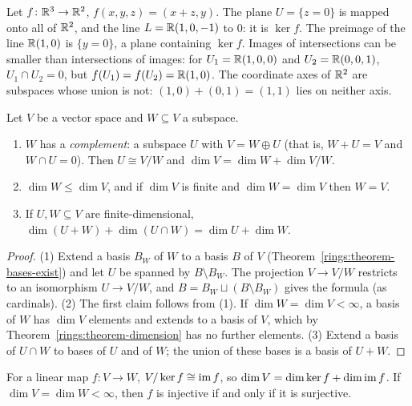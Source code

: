 \begin{example}\label{linear-algebra:example-images-subspaces}
Let $f \colon \mathbb{R}^3 \to \mathbb{R}^2$, $f(x, y, z) = (x + z, y)$. The plane $U = \{z = 0\}$ is mapped onto all of $\mathbb{R}^2$, and the line $L = \mathbb{R}(1, 0, -1)$ to $0$: it is $\ker f$. The preimage of the line $\mathbb{R}(1, 0)$ is
$\{y = 0\}$, a plane containing $\ker f$. Images of intersections can be smaller than intersections of images: for $U_1 = \mathbb{R}(1, 0, 0)$ and $U_2 = \mathbb{R}(0, 0, 1)$, $U_1 \cap U_2 = 0$, but
$f(U_1) = f(U_2) = \mathbb{R}(1, 0)$. The coordinate axes of $\mathbb{R}^2$ are subspaces whose union is not: $(1, 0) + (0, 1) = (1, 1)$ lies on neither axis.
\end{example}

\begin{proposition}\label{linear-algebra:proposition-subspaces}
Let $V$ be a vector space and $W \subseteq V$ a subspace.
\begin{enumerate}
\item $W$ has a \emph{complement}: a subspace $U$ with $V = W \oplus U$ (that is, $W + U = V$ and
$W \cap U = 0$). Then $U \cong V/W$ and $\dim V = \dim W + \dim V/W$.
\item $\dim W \leq \dim V$, and if $\dim V$ is finite and $\dim W = \dim V$ then $W = V$.
\item If $U, W \subseteq V$ are finite-dimensional, $\dim(U + W) + \dim(U \cap W) = \dim U + \dim W$.
\end{enumerate}
\end{proposition}

\begin{proof}
(1) Extend a basis $B_W$ of $W$ to a basis $B$ of $V$ (Theorem~\ref{rings:theorem-bases-exist}) and
let $U$ be spanned by $B \setminus B_W$. The projection $V \to V/W$ restricts to an isomorphism
$U \to V/W$, and $B = B_W \sqcup (B \setminus B_W)$ gives the formula (as cardinals).
(2) The first claim follows from (1). If $\dim W = \dim V < \infty$, a basis of $W$ has $\dim V$
elements and extends to a basis of $V$, which by Theorem~\ref{rings:theorem-dimension} has no
further elements.
(3) Extend a basis of $U \cap W$ to bases of $U$ and of $W$; the union of these bases is a basis of
$U + W$.
\end{proof}

\begin{theorem}\label{linear-algebra:theorem-rank-nullity}
For a linear map $f \colon V \to W$, $V/\ker f \cong \operatorname{im} f$, so
$\dim V = \dim \ker f + \dim \operatorname{im} f$. If $\dim V = \dim W < \infty$, then $f$ is injective if and
only if it is surjective.
\end{theorem}

